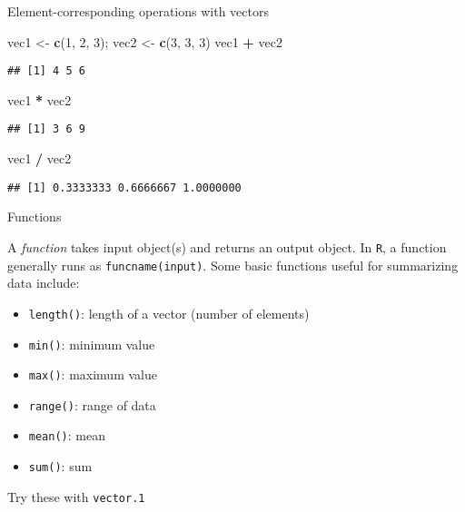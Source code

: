 \documentclass[ignorenonframetext,]{beamer}
\newenvironment{Shaded}{\begin{snugshade}}{\end{snugshade}}
\newcommand{\KeywordTok}[1]{\textcolor[rgb]{0.13,0.29,0.53}{\textbf{#1}}}
\newcommand{\DecValTok}[1]{\textcolor[rgb]{0.00,0.00,0.81}{#1}}
\newcommand{\StringTok}[1]{\textcolor[rgb]{0.31,0.60,0.02}{#1}}
\newcommand{\OperatorTok}[1]{\textcolor[rgb]{0.81,0.36,0.00}{\textbf{#1}}}
\newcommand{\NormalTok}[1]{#1}
\providecommand{\tightlist}{%
	\setlength{\itemsep}{0pt}\setlength{\parskip}{0pt}}
\begin{document}
\begin{frame}[fragile]{Element-corresponding operations with vectors}

\begin{Shaded}
\begin{Highlighting}[]
\NormalTok{vec1 <-}\StringTok{ }\KeywordTok{c}\NormalTok{(}\DecValTok{1}\NormalTok{, }\DecValTok{2}\NormalTok{, }\DecValTok{3}\NormalTok{); vec2 <-}\StringTok{ }\KeywordTok{c}\NormalTok{(}\DecValTok{3}\NormalTok{, }\DecValTok{3}\NormalTok{, }\DecValTok{3}\NormalTok{)}
\NormalTok{vec1 }\OperatorTok{+}\StringTok{ }\NormalTok{vec2}
\end{Highlighting}
\end{Shaded}

\begin{verbatim}
## [1] 4 5 6
\end{verbatim}

\begin{Shaded}
\begin{Highlighting}[]
\NormalTok{vec1 }\OperatorTok{*}\StringTok{ }\NormalTok{vec2}
\end{Highlighting}
\end{Shaded}

\begin{verbatim}
## [1] 3 6 9
\end{verbatim}

\begin{Shaded}
\begin{Highlighting}[]
\NormalTok{vec1 }\OperatorTok{/}\StringTok{ }\NormalTok{vec2}
\end{Highlighting}
\end{Shaded}

\begin{verbatim}
## [1] 0.3333333 0.6666667 1.0000000
\end{verbatim}

\end{frame}

\begin{frame}[fragile]{Functions}

A \emph{function} takes input object(s) and returns an output object. In
\texttt{R}, a function generally runs as \texttt{funcname(input)}. Some
basic functions useful for summarizing data include:

\begin{itemize}
\tightlist
\item
  \texttt{length()}: length of a vector (number of elements)
\item
  \texttt{min()}: minimum value
\item
  \texttt{max()}: maximum value
\item
  \texttt{range()}: range of data
\item
  \texttt{mean()}: mean
\item
  \texttt{sum()}: sum
\end{itemize}

Try these with \texttt{vector.1}

\end{frame}
\end{document}
